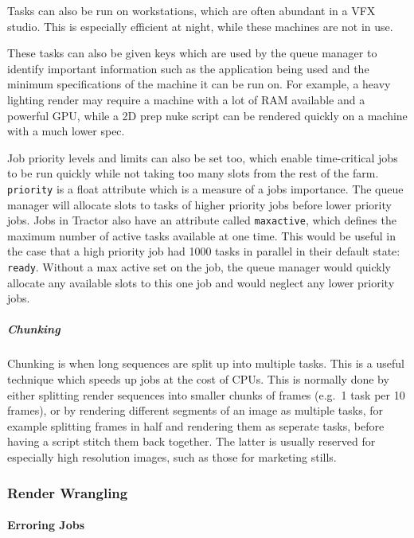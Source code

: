 Tasks can also be run on workstations, which are often abundant in a VFX studio. This is especially efficient at night, while these machines are not in use.

These tasks can also be given keys which are used by the queue manager to identify important information such as the application being used and the minimum specifications of the machine it can be run on. For example, a heavy lighting render may require a machine with a lot of RAM available and a powerful GPU, while a 2D prep nuke script can be rendered quickly on a machine with a much lower spec.

Job priority levels and limits can also be set too, which enable time-critical jobs to be run quickly while not taking too many slots from the rest of the farm. \texttt{priority} is a float attribute which is a measure of a jobs importance. The queue manager will allocate slots to tasks of higher priority jobs before lower priority jobs. Jobs in Tractor also have an attribute called \texttt{maxactive}, which defines the maximum number of active tasks available at one time. This would be useful in the case that a high priority job had 1000 tasks in parallel in their default state: \texttt{ready}. Without a max active set on the job, the queue manager would quickly allocate any available slots to this one job and would neglect any lower priority jobs.

\hypertarget{chunking}{%
\subparagraph{Chunking}\label{chunking}}

Chunking is when long sequences are split up into multiple tasks. This is a useful technique which speeds up jobs at the cost of CPUs. This is normally done by either splitting render sequences into smaller chunks of frames (e.g.~1 task per 10 frames), or by rendering different segments of an image as multiple tasks, for example splitting frames in half and rendering them as seperate tasks, before having a script stitch them back together. The latter is usually reserved for especially high resolution images, such as those for marketing stills.

\hypertarget{render-wrangling}{%
\subsubsection{Render Wrangling}\label{render-wrangling}}

\hypertarget{erroring-jobs}{%
\paragraph{Erroring Jobs}\label{erroring-jobs}}


